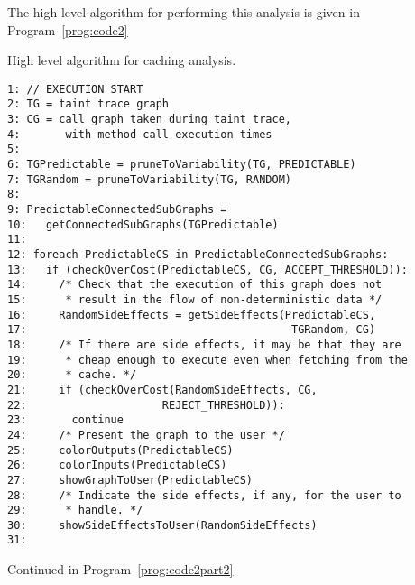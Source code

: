 \documentclass[msc,oneside]{ubcthesis}
\begin{document}
The high-level algorithm for performing this analysis is given in Program~\ref{prog:code2}

\begin{Program}
  \caption{\label{prog:code2} High level algorithm for caching analysis.}
\begin{verbatim}
1: // EXECUTION START
2: TG = taint trace graph
3: CG = call graph taken during taint trace, 
4:       with method call execution times
5: 
6: TGPredictable = pruneToVariability(TG, PREDICTABLE)
7: TGRandom = pruneToVariability(TG, RANDOM)
8: 
9: PredictableConnectedSubGraphs = 
10:   getConnectedSubGraphs(TGPredictable)
11: 
12: foreach PredictableCS in PredictableConnectedSubGraphs:
13:   if (checkOverCost(PredictableCS, CG, ACCEPT_THRESHOLD)):
14:     /* Check that the execution of this graph does not 
15:      * result in the flow of non-deterministic data */
16:     RandomSideEffects = getSideEffects(PredictableCS, 
17:                                         TGRandom, CG)
18:     /* If there are side effects, it may be that they are 
19:      * cheap enough to execute even when fetching from the
20:      * cache. */
21:     if (checkOverCost(RandomSideEffects, CG, 
22:                     REJECT_THRESHOLD)):
23:       continue
24:     /* Present the graph to the user */
25:     colorOutputs(PredictableCS)
26:     colorInputs(PredictableCS)
27:     showGraphToUser(PredictableCS)
28:     /* Indicate the side effects, if any, for the user to 
29:      * handle. */
30:     showSideEffectsToUser(RandomSideEffects)
31:   
\end{verbatim}
Continued in Program~\ref{prog:code2part2}
\end{Program}
\end{document}
